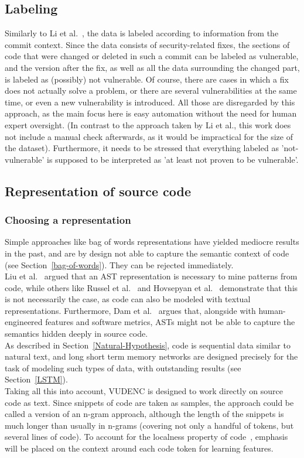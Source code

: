 \documentclass[
a4paper,
pagesize,
pdftex,
12pt,
twoside, %
BCOR=5mm, %
ngerman,
fleqn,
final,
]{scrartcl}
\begin{document}
	
	\subsection{Labeling}
	Similarly to Li et al.~\cite{Li.2018}, the data is labeled according to information from the commit context. Since the data consists of security-related fixes, the sections of code that were changed or deleted in such a commit can be labeled as vulnerable, and the version after the fix, as well as all the data surrounding the changed part, is labeled as (possibly) not vulnerable. Of course, there are cases in which a fix does not actually solve a problem, or there are several vulnerabilities at the same time, or even a new vulnerability is introduced. All those are disregarded by this approach, as the main focus here is easy automation without the need for human expert oversight. (In contrast to the approach taken by Li et al., this work does not include a manual check afterwards, as it would be impractical for the size of the dataset). Furthermore, it needs to be stressed that everything labeled as 'not-vulnerable' is supposed to be interpreted as 'at least not proven to be vulnerable'.
	
	\subsection{Representation of source code}
	
	\subsubsection{Choosing a representation}
	Simple approaches like bag of words representations have yielded mediocre results in the past, and are by design not able to capture the semantic context of code (see Section~\ref{bag-of-words}). They can be rejected immediately.\\
	Liu et al.~\cite{Liu.2018} argued that an AST representation is necessary to mine patterns from code, while others like Russel et al.~\cite{Russell.2018} and Hovsepyan et al.~\cite{Hovsepyan.2012} demonstrate that this is not necessarily the case, as code can also be modeled with textual representations. Furthermore, Dam et al.~\cite{Dam.2016} argues that, alongside with human-engineered features and software metrics, ASTs might not be able to capture the semantics hidden deeply in source code.\\
	As described in Section~\ref{Natural-Hypothesis}, code is sequential data similar to natural text, and long short term memory networks are designed precisely for the task of modeling such types of data, with outstanding results (see Section~\ref{LSTM}).\\
	Taking all this into account, VUDENC is designed to work directly on source code as text. Since snippets of code are taken as samples, the approach could be called a version of an n-gram approach, although the length of the snippets is much longer than usually in n-grams (covering not only a handful of tokens, but several lines of code). To account for the localness property of code~\cite{Tu.2014}, emphasis will be placed on the context around each code token for learning features.
	
\end{document}
